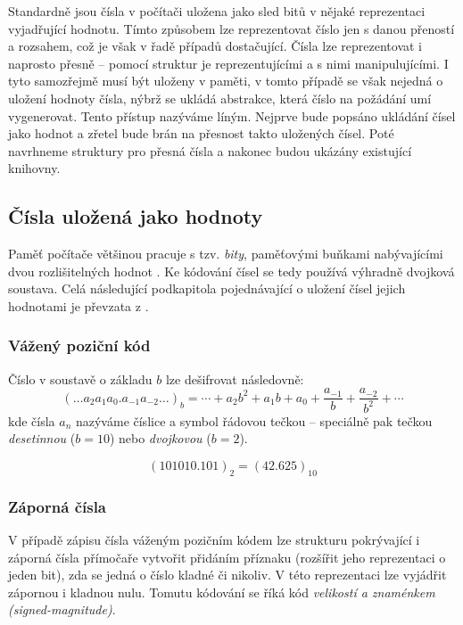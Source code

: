 Standardně jsou čísla v počítači uložena jako sled bitů v nějaké reprezentaci vyjadřující hodnotu. Tímto způsobem lze reprezentovat číslo jen s danou přeností a rozsahem, což je však v řadě případů dostačující. Čísla lze reprezentovat i naprosto přesně -- pomocí struktur je reprezentujícími a s nimi manipulujícími. I tyto samozřejmě musí být uloženy v paměti, v tomto případě se však nejedná o uložení hodnoty čísla, nýbrž se ukládá abstrakce, která číslo na požádání umí vygenerovat. Tento přístup nazýváme líným. Nejprve bude popsáno ukládání čísel jako hodnot a zřetel bude brán na přesnost takto uložených čísel. Poté navrhneme struktury pro přesná čísla a nakonec budou ukázány existující knihovny.

\subsection{Čísla uložená jako hodnoty}
Paměť počítače většinou pracuje s tzv. \textit{bity}, paměťovými buňkami nabývajícími dvou rozlišitelných hodnot \cite{KepOS}. Ke kódování čísel se tedy používá výhradně dvojková soustava. Celá následující podkapitola pojednávající o uložení čísel jejich hodnotami je převzata z \cite{Knu02}.

\subsubsection{Vážený poziční kód}
Číslo v soustavě o základu $b$ lze dešifrovat následovně:
\begin{equation}
(\ldots a_2a_1a_0.a_{-1}a_{-2} \ldots )_b = \cdots + a_2b^2 + a_1b + a_0 + \frac{a_{-1}}{b} + \frac{a_{-2}}{b^2} + \cdots
\end{equation}kde čísla $a_n$ nazýváme číslice a symbol  řádovou tečkou -- speciálně pak tečkou \textit{desetinnou} ($b=10$) nebo \textit{dvojkovou} ($b=2$).

\begin{example}
\begin{equation}
(101010.101)_2 = (42.625)_{10}
\end{equation}
\end{example}

\subsubsection{Záporná čísla}
V případě zápisu čísla váženým pozičním kódem lze strukturu pokrývající i záporná čísla přímočaře vytvořit přidáním příznaku (rozšířit jeho reprezentaci o jeden bit), zda se jedná o číslo kladné či nikoliv. V této reprezentaci lze vyjádřit zápornou i kladnou nulu. Tomutu kódování se říká kód \textit{velikostí a znaménkem (signed-magnitude)}.

